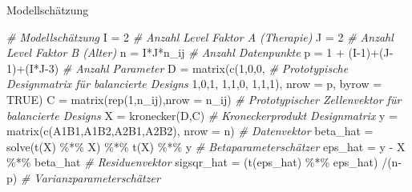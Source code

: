 \documentclass[
  8pt,
  ignorenonframetext,
]{beamer}
\newenvironment{Shaded}{\begin{snugshade}}{\end{snugshade}}
\newcommand{\AttributeTok}[1]{\textcolor[rgb]{0.77,0.63,0.00}{#1}}
\newcommand{\CommentTok}[1]{\textcolor[rgb]{0.56,0.35,0.01}{\textit{#1}}}
\newcommand{\ConstantTok}[1]{\textcolor[rgb]{0.00,0.00,0.00}{#1}}
\newcommand{\DecValTok}[1]{\textcolor[rgb]{0.00,0.00,0.81}{#1}}
\newcommand{\FunctionTok}[1]{\textcolor[rgb]{0.00,0.00,0.00}{#1}}
\newcommand{\NormalTok}[1]{#1}
\newcommand{\OtherTok}[1]{\textcolor[rgb]{0.56,0.35,0.01}{#1}}
\newcommand{\SpecialCharTok}[1]{\textcolor[rgb]{0.00,0.00,0.00}{#1}}
\begin{document}
\begin{frame}[fragile]{Modellschätzung}
\begin{Shaded}
\begin{Highlighting}[]
\CommentTok{\# Modellschätzung}
\NormalTok{I          }\OtherTok{=} \DecValTok{2}                                               \CommentTok{\# Anzahl Level Faktor A (Therapie)}
\NormalTok{J          }\OtherTok{=} \DecValTok{2}                                               \CommentTok{\# Anzahl Level Faktor B (Alter)}
\NormalTok{n          }\OtherTok{=}\NormalTok{ I}\SpecialCharTok{*}\NormalTok{J}\SpecialCharTok{*}\NormalTok{n\_ij                                        }\CommentTok{\# Anzahl Datenpunkte}
\NormalTok{p          }\OtherTok{=} \DecValTok{1} \SpecialCharTok{+}\NormalTok{ (I}\DecValTok{{-}1}\NormalTok{)}\SpecialCharTok{+}\NormalTok{(J}\DecValTok{{-}1}\NormalTok{)}\SpecialCharTok{+}\NormalTok{(I}\SpecialCharTok{*}\NormalTok{J}\DecValTok{{-}3}\NormalTok{)                         }\CommentTok{\# Anzahl Parameter}
\NormalTok{D          }\OtherTok{=} \FunctionTok{matrix}\NormalTok{(}\FunctionTok{c}\NormalTok{(}\DecValTok{1}\NormalTok{,}\DecValTok{0}\NormalTok{,}\DecValTok{0}\NormalTok{,                                 }\CommentTok{\# Prototypische Designmatrix für balancierte Designs}
                      \DecValTok{1}\NormalTok{,}\DecValTok{0}\NormalTok{,}\DecValTok{1}\NormalTok{,}
                      \DecValTok{1}\NormalTok{,}\DecValTok{1}\NormalTok{,}\DecValTok{0}\NormalTok{,}
                      \DecValTok{1}\NormalTok{,}\DecValTok{1}\NormalTok{,}\DecValTok{1}\NormalTok{), }\AttributeTok{nrow =}\NormalTok{ p, }\AttributeTok{byrow =} \ConstantTok{TRUE}\NormalTok{)}
\NormalTok{C          }\OtherTok{=} \FunctionTok{matrix}\NormalTok{(}\FunctionTok{rep}\NormalTok{(}\DecValTok{1}\NormalTok{,n\_ij),}\AttributeTok{nrow =}\NormalTok{ n\_ij)                 }\CommentTok{\# Prototypischer Zellenvektor für balancierte Designs}
\NormalTok{X          }\OtherTok{=} \FunctionTok{kronecker}\NormalTok{(D,C)                                  }\CommentTok{\# Kroneckerprodukt Designmatrix}
\NormalTok{y          }\OtherTok{=} \FunctionTok{matrix}\NormalTok{(}\FunctionTok{c}\NormalTok{(A1B1,A1B2,A2B1,A2B2), }\AttributeTok{nrow =}\NormalTok{ n)        }\CommentTok{\# Datenvektor}
\NormalTok{beta\_hat   }\OtherTok{=} \FunctionTok{solve}\NormalTok{(}\FunctionTok{t}\NormalTok{(X) }\SpecialCharTok{\%*\%}\NormalTok{ X) }\SpecialCharTok{\%*\%} \FunctionTok{t}\NormalTok{(X) }\SpecialCharTok{\%*\%}\NormalTok{ y                }\CommentTok{\# Betaparameterschätzer}
\NormalTok{eps\_hat    }\OtherTok{=}\NormalTok{ y }\SpecialCharTok{{-}}\NormalTok{ X }\SpecialCharTok{\%*\%}\NormalTok{ beta\_hat                              }\CommentTok{\# Residuenvektor}
\NormalTok{sigsqr\_hat }\OtherTok{=}\NormalTok{ (}\FunctionTok{t}\NormalTok{(eps\_hat) }\SpecialCharTok{\%*\%}\NormalTok{ eps\_hat) }\SpecialCharTok{/}\NormalTok{(n}\SpecialCharTok{{-}}\NormalTok{p)                 }\CommentTok{\# Varianzparameterschätzer}

\end{Highlighting}
\end{Shaded}
\end{frame}
\end{document}
